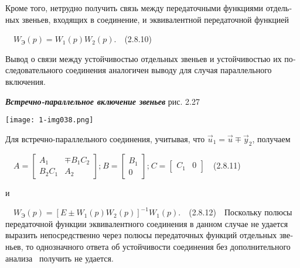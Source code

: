 \documentclass[a4paper]{article}
\begin{document}
{\begin{russian}\sffamily
Кроме того, нетрудно получить связь между передаточными функциями отдельных звеньев, входящих в соединение, и
эквивалентной передаточ­ной функцией
\end{russian}}

{\begin{russian}\sffamily
\ \  $W_Э(p)=W_1(p)W_2(p)$.\ \ (2.8.10)
\end{russian}}

{\begin{russian}\sffamily
Вывод о связи между устойчивостью отдельных звеньев и устойчивостью их последовательного соединения аналогичен выводу
для случая параллельного включения. 
\end{russian}}


\bigskip

{\begin{russian}\sffamily
\textbf{\textit{Встречно-параллельное включение звеньев }}рис. 2.27
\end{russian}}


\bigskip

{\centering  \texttt{[image: 1-img038.png]} \par}

\bigskip

{\begin{russian}\sffamily
Для встречно-параллельного соединения, учитывая, что  $\vec u_1=\vec u\mp \vec y_2$, получаем
\end{russian}}

{\begin{russian}\sffamily
\ \  $A=\left[\begin{matrix}A_1&\mp
B_1C_2\\B_2C_1&A_2\end{matrix}\right];_{}^{}B=\left[\begin{matrix}B_1\\0\end{matrix}\right];_{}^{}C=\left[\begin{matrix}C_1&0\end{matrix}\right]$\ \ (2.8.11)
\end{russian}}

{\begin{russian}\sffamily
и
\end{russian}}


\bigskip

{\begin{russian}\sffamily
\ \  $W_Э(p)=\left[E\pm W_1(p)W_2(p)\right]^{-1}W_1(p)$.\ \ (2.8.12)\ \ Поскольку полюсы передаточной функции
эквивалентного соединения в данном случае не удается выразить непосредственно через полюсы передаточных функций
отдельных звеньев, то однозначного ответа об устойчивости соединения без дополнительного анализа \ получить не удается.
\end{russian}}
\end{document}
